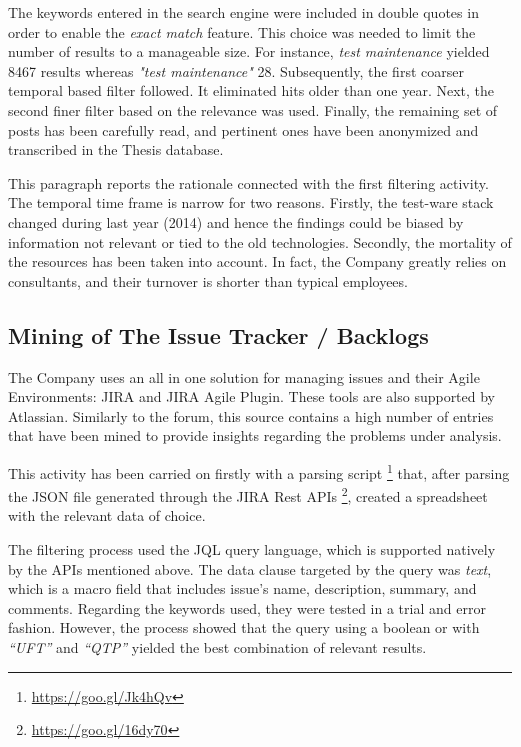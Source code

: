 The keywords entered in the search engine were included in double quotes in order to enable the \textit{exact match} feature. This choice was needed to limit the number of results to a manageable size. For instance, \textit{test maintenance} yielded 8467 results whereas \textit{"test maintenance"} 28. Subsequently, the first coarser temporal based filter followed. It eliminated hits older than one year. Next, the second finer filter based on the relevance was used. Finally, the remaining set of posts has been carefully read, and pertinent ones have been anonymized and transcribed in the Thesis database.

This paragraph reports the rationale connected with the first filtering activity. The temporal time frame is narrow for two reasons. Firstly, the test-ware stack changed during last year (2014) and hence the findings could be biased by information not relevant or tied to the old technologies. Secondly, the mortality of the resources has been taken into account. In fact, the Company greatly relies on consultants, and their turnover is shorter than typical employees.

\subsection{Mining of The Issue Tracker / Backlogs} \label{mining_issue_tracker}
The Company uses an all in one solution for managing issues and their Agile Environments: JIRA and JIRA Agile Plugin. These tools are also supported by Atlassian. Similarly to the forum, this source contains a high number of entries that have been mined to provide insights regarding the problems under analysis.

This activity has been carried on firstly with a parsing script \footnote{\href{https://goo.gl/Jk4hQv}{https://goo.gl/Jk4hQv}} that, after parsing the JSON file generated through the JIRA Rest APIs \footnote{\href{https://goo.gl/16dy70}{https://goo.gl/16dy70}}, created a spreadsheet with the relevant data of choice.

The filtering process used the JQL query language, which is supported natively by the APIs mentioned above. The data clause targeted by the query was \textit{text}, which is a macro field that includes issue's name, description, summary, and comments. Regarding the keywords used, they were tested in a trial  and error fashion. However, the process showed that the query using a boolean or with \textit{``UFT''} and \textit{``QTP''} yielded the best combination of relevant results.

